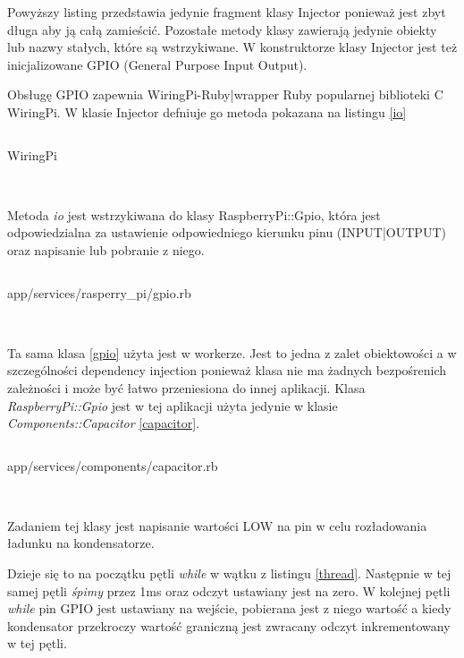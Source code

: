 \documentclass[11pt,a4paper, twoside]{article}
\begin{document}
Powyższy listing przedstawia jedynie fragment klasy Injector ponieważ jest zbyt długa aby ją całą zamieścić. Pozostałe metody klasy zawierają jedynie obiekty lub nazwy stałych, które są wstrzykiwane. W konstruktorze klasy Injector jest też inicjalizowane GPIO (General Purpose Input Output).

Obsługę GPIO zapewnia WiringPi-Ruby|wrapper Ruby popularnej biblioteki C WiringPi. W klasie Injector defniuje go metoda pokazana na listingu \ref{io}

\begin{listing}[H]
\inputminted[linenos=true]{ruby}{./src/io.rb}
\caption{WiringPi}
$\label{io}$
\end{listing}

Metoda \emph{io} jest wstrzykiwana do klasy RaspberryPi::Gpio, która jest odpowiedzialna za ustawienie odpowiedniego kierunku pinu (INPUT|OUTPUT) oraz napisanie lub pobranie z niego.

\begin{listing}[H]
\inputminted[linenos=true]{ruby}{./src/gpio.rb}
\caption{app/services/rasperry\_pi/gpio.rb}
$\label{gpio}$
\end{listing}

Ta sama klasa \ref{gpio} użyta jest w workerze. Jest to jedna z zalet obiektowości a w szczególności dependency injection ponieważ klasa nie ma żadnych bezpośrenich zależności i może być łatwo przeniesiona do innej aplikacji. Klasa \emph{RaspberryPi::Gpio} jest w tej aplikacji użyta jedynie w klasie \emph{Components::Capacitor} \ref{capacitor}.
\begin{listing}[H]
\inputminted[linenos=true]{ruby}{./src/capacitor.rb}
\caption{app/services/components/capacitor.rb}
$\label{capacitor}$
\end{listing}

Zadaniem tej klasy jest napisanie wartości LOW na pin w celu rozładowania ładunku na kondensatorze. 

 
Dzieje się to na początku pętli \emph{while} w wątku z listingu \ref{thread}. Następnie w tej samej pętli \emph{śpimy} przez 1ms oraz odczyt ustawiany jest na zero. W kolejnej pętli \emph{while} pin GPIO jest ustawiany na wejście, pobierana jest z niego wartość a kiedy kondensator przekroczy wartość graniczną jest zwracany odczyt inkrementowany w tej pętli. 
 
\end{document}
